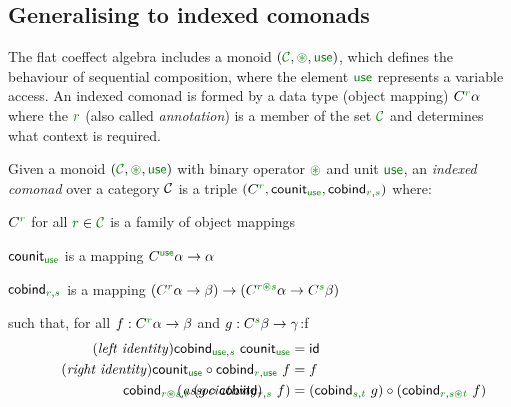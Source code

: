 
\subsection{Generalising to indexed comonads}
\label{sec:semantics-flat-idx}

The flat coeffect algebra includes a monoid $(\C, \cseq, \cunit)$, which defines the behaviour of
sequential composition, where the element $\cunit$ represents a variable access. An indexed
comonad is formed by a data type (object mapping) $\ctyp{\cclrd{r}}{\alpha}$ where the $\cclrd{r}$
(also called \emph{annotation}) is a member of the set $\C$ and determines what context is required.

\begin{definition}
Given a monoid $(\C, \cseq, \cunit)$ with binary operator $\cseq$ and unit $\cunit$, an
\emph{indexed comonad} over a category $\mathcal{C}$ is a triple
$(\ctyp{\cclrd{r}{}}, \ident{counit}_{\cunit}, \ident{cobind}_{\cclrd{r}, \cclrd{s}})$ where:

\begin{compactitem}
\item $\ctyp{\cclrd{r}}{}$ for all $\cclrd{r} \in \C$ is a family of object mappings
\item $\ident{counit}_{\cunit}$ is a mapping $\ctyp{\cunit}{\alpha} \rightarrow \alpha$
\item $\ident{cobind}_{\cclrd{r}, \cclrd{s}}$ is a mapping $(\ctyp{\cclrd{r}}{\alpha} \rightarrow \beta)
  \rightarrow (\ctyp{\cclrd{r}\cseq\cclrd{s}}{\alpha} \rightarrow \ctyp{\cclrd{s}}{\beta})$
\end{compactitem}
such that, for all $f:\ctyp{\cclrd{r}}{\alpha} \rightarrow \beta$ and $g:\ctyp{\cclrd{s}}{\beta} \rightarrow \gamma$:f
\begin{align}
\tag{\emph{left identity}}
  \ident{cobind}_{\cunit, \cclrd{s}}~\ident{counit}_{\cunit} &= \idf{}
  \\
\tag{\emph{right identity}}
  \ident{counit}_{\cunit} \circ \ident{cobind}_{\cclrd{r}, \cunit}~f &= f
  \\
\tag{\emph{associativity}}
\hspace{-10em}
  \ident{cobind}_{\cclrd{r}\cseq\cclrd{s},\cclrd{t}}~(g \circ \ident{cobind}_{\cclrd{r}, \cclrd{s}}~f) &=
    (\ident{cobind}_{\cclrd{s}, \cclrd{t}}~g) \circ (\ident{cobind}_{\cclrd{r}, \cclrd{s}\cseq\cclrd{t}}~f)
\end{align}
\end{definition}

